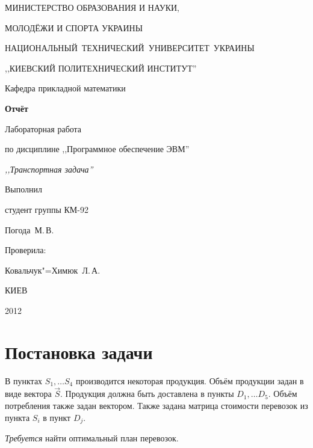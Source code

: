 \documentclass[a4paper,12pt,notitlepage,headsepline,pdftex]{scrartcl}
\begin{document}
\begin{titlepage}
  \begin{center}
    \large
    \MakeUppercase{Министерство образования и науки,}

    \MakeUppercase{молодёжи и спорта Украины}

    \mbox{\MakeUppercase{Национальный технический университет Украины}}

    \MakeUppercase{,,Киевский политехнический институт''}

    \addvspace{6pt}

    \normalsize
    Кафедра прикладной математики

    \vfill

    \textbf{Отчёт}

    Лабораторная работа 

    по дисциплине ,,Программное обеспечение ЭВМ''

    \emph{,,Транспортная задача''}
  \end{center}

  \vfill

  \noindent
  \begin{minipage}{0.3\textwidth}
    Выполнил

    студент группы КМ-92

    Погода~М.\,В.
  \end{minipage}
  \hfill
  \begin{minipage}{0.4\textwidth}
    Проверила:

    Ковальчук"=Химюк~Л.\,А.
  \end{minipage}
  \vfill

  \begin{center}
    КИЕВ

    2012
  \end{center}
\end{titlepage}
\tableofcontents
\newpage
\section{Постановка задачи}
  В пунктах $S_1,\dots S_4$ производится некоторая продукция.
  Объём продукции задан в виде вектора $\vec{S}$.
  Продукция должна быть доставлена в пункты $D_1,\dots D_5$.
  Объём потребления также задан вектором.
  Также задана матрица стоимости перевозок из пункта $S_i$ в пункт $D_j$.

  \textit{Требуется} найти оптимальный план перевозок.
\end{document}
